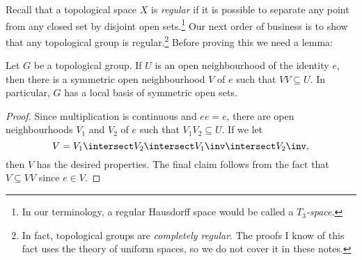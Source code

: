 \documentclass[article, a4paper, 11pt, oneside]{memoir}
\numberwithin{equation}{chapter}
\begin{document}



Recall that a topological space $X$ is \emph{regular} if it is possible to separate any point from any closed set by disjoint open sets.\footnote{In our terminology, a regular Hausdorff space would be called a \emph{$T_3$-space}.} Our next order of business is to show that any topological group is regular.\footnote{In fact, topological groups are \emph{completely regular}. The proofs I know of this fact uses the theory of uniform spaces, so we do not cover it in these notes.} Before proving this we need a lemma:

\begin{lemma}
    \label{thm:symmetric_nhood_of_e}
    Let $G$ be a topological group. If $U$ is an open neighbourhood of the identity $e$, then there is a symmetric open neighbourhood $V$ of $e$ such that $VV \subseteq U$. In particular, $G$ has a local basis of symmetric open sets.
\end{lemma}

\begin{proof}
    Since multiplication is continuous and $ee = e$, there are open neighbourhoods $V_1$ and $V_2$ of $e$ such that $V_1 V_2 \subseteq U$. If we let
    \begin{equation*}
        V = V_1 \intersect V_2 \intersect V_1\inv \intersect V_2\inv,
    \end{equation*}
    then $V$ has the desired properties. The final claim follows from the fact that $V \subseteq VV$ since $e \in V$.
\end{proof}
\end{document}
